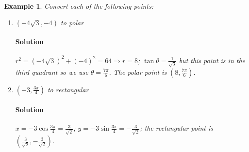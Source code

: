 \documentclass[letterpaper, 11pt, openany]{book}
\theoremstyle{mytheoremstyle}
\theoremstyle{myexamplestyle}
\newtheorem{example}{Example}[section]
\newenvironment{solution}{\paragraph{\sffamily \smaller \fontseries{b}\selectfont Solution}}{\hfill\faSquare}
\begin{document}
\begin{example}\label{e:polarconvpoints}
    Convert each of the following points:
    \begin{enumerate}[label=\alph*.]
        \item $(-4\sqrt{3}, -4)$ to polar
        \begin{solution}
            $r^{2} = \left( -4\sqrt{3} \right)^{2} + (-4)^{2} = 64 \Rightarrow r = 8$; $\tan \theta = \frac{1}{\sqrt{3}}$ but this point is in the third quadrant so we use $\theta = \frac{7\pi}{6}$. The polar point is $(8, \frac{7\pi}{6})$. 
        \end{solution}
        \item $\left( -3, \frac{3\pi}{4} \right)$ to rectangular
        \begin{solution}
            $x = -3 \cos \frac{3\pi}{4} = \frac{3}{\sqrt{2}}$; $y = -3 \sin \frac{3\pi}{4} = -\frac{3}{\sqrt{2}}$; the rectangular point is $\left(\frac{3}{\sqrt{2}} , -\frac{3}{\sqrt{2}} \right)$.
        \end{solution}
    \end{enumerate}
\end{example}
\end{document}
